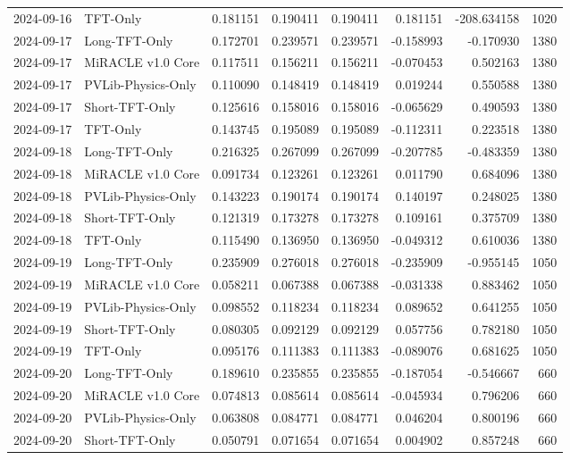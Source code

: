 \begin{tabular}{llrrrrrr}
2024-09-16 & TFT-Only & 0.181151 & 0.190411 & 0.190411 & 0.181151 & -208.634158 & 1020 \\
2024-09-17 & Long-TFT-Only & 0.172701 & 0.239571 & 0.239571 & -0.158993 & -0.170930 & 1380 \\
2024-09-17 & MiRACLE v1.0 Core & 0.117511 & 0.156211 & 0.156211 & -0.070453 & 0.502163 & 1380 \\
2024-09-17 & PVLib-Physics-Only & 0.110090 & 0.148419 & 0.148419 & 0.019244 & 0.550588 & 1380 \\
2024-09-17 & Short-TFT-Only & 0.125616 & 0.158016 & 0.158016 & -0.065629 & 0.490593 & 1380 \\
2024-09-17 & TFT-Only & 0.143745 & 0.195089 & 0.195089 & -0.112311 & 0.223518 & 1380 \\
2024-09-18 & Long-TFT-Only & 0.216325 & 0.267099 & 0.267099 & -0.207785 & -0.483359 & 1380 \\
2024-09-18 & MiRACLE v1.0 Core & 0.091734 & 0.123261 & 0.123261 & 0.011790 & 0.684096 & 1380 \\
2024-09-18 & PVLib-Physics-Only & 0.143223 & 0.190174 & 0.190174 & 0.140197 & 0.248025 & 1380 \\
2024-09-18 & Short-TFT-Only & 0.121319 & 0.173278 & 0.173278 & 0.109161 & 0.375709 & 1380 \\
2024-09-18 & TFT-Only & 0.115490 & 0.136950 & 0.136950 & -0.049312 & 0.610036 & 1380 \\
2024-09-19 & Long-TFT-Only & 0.235909 & 0.276018 & 0.276018 & -0.235909 & -0.955145 & 1050 \\
2024-09-19 & MiRACLE v1.0 Core & 0.058211 & 0.067388 & 0.067388 & -0.031338 & 0.883462 & 1050 \\
2024-09-19 & PVLib-Physics-Only & 0.098552 & 0.118234 & 0.118234 & 0.089652 & 0.641255 & 1050 \\
2024-09-19 & Short-TFT-Only & 0.080305 & 0.092129 & 0.092129 & 0.057756 & 0.782180 & 1050 \\
2024-09-19 & TFT-Only & 0.095176 & 0.111383 & 0.111383 & -0.089076 & 0.681625 & 1050 \\
2024-09-20 & Long-TFT-Only & 0.189610 & 0.235855 & 0.235855 & -0.187054 & -0.546667 & 660 \\
2024-09-20 & MiRACLE v1.0 Core & 0.074813 & 0.085614 & 0.085614 & -0.045934 & 0.796206 & 660 \\
2024-09-20 & PVLib-Physics-Only & 0.063808 & 0.084771 & 0.084771 & 0.046204 & 0.800196 & 660 \\
2024-09-20 & Short-TFT-Only & 0.050791 & 0.071654 & 0.071654 & 0.004902 & 0.857248 & 660 \\

\end{tabular}
